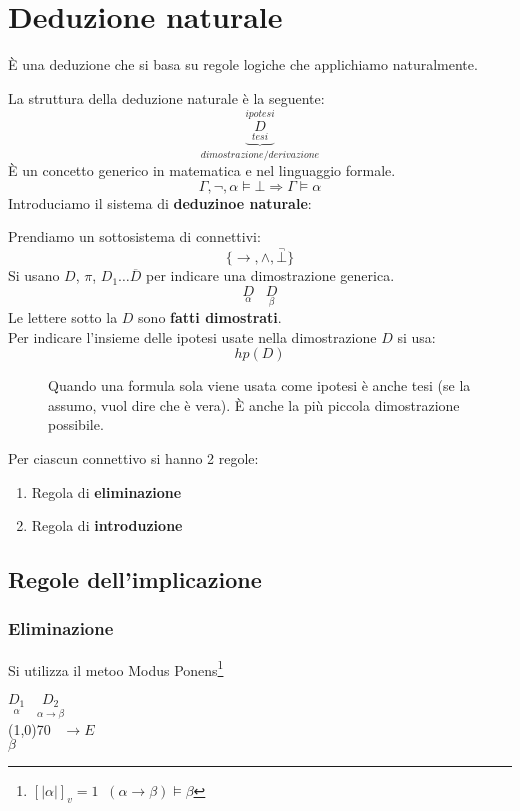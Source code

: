 \documentclass{article}
\theoremstyle{break}
\theoremstyle{break}
\theoremstyle{break}
\theoremstyle{break}
\begin{document}
\section{Deduzione naturale}
È una deduzione che si basa su regole logiche che applichiamo naturalmente.

La struttura della deduzione naturale è la seguente:
\[
    \underbrace{\stackrel{ipotesi}{\underset{tesi}{D}}}_{dimostrazione/derivazione}
\] 
È un concetto generico in matematica e nel linguaggio formale.
\[
\Gamma, \neg, \alpha \models \bot \Rightarrow \Gamma \models \alpha
\] 
Introduciamo il sistema di \textbf{deduzinoe naturale}:

Prendiamo un sottosistema di connettivi:
\[
    \{ \to, \wedge, \stackrel{\neg}{\bot}\} 
\] 
Si usano \( D \), \( \pi \), \( D_1 \ldots \overline{D} \) per indicare una dimostrazione
generica.
\[
    \underset{\alpha}{D}\;\;\; \underset{\beta}{D}
\] 
Le lettere sotto la \( D \) sono \textbf{fatti dimostrati}.\\
Per indicare l'insieme delle ipotesi usate nella dimostrazione \( D \) si usa: 
\[
hp(D)
\] 
\begin{figure}[H]
    \begin{definition}
        Quando una formula sola viene usata come ipotesi è anche tesi (se la assumo, vuol dire che è vera).
        È anche la più piccola dimostrazione possibile.
    \end{definition}
\end{figure}

Per ciascun connettivo si hanno 2 regole:
\begin{enumerate}
    \item Regola di \textbf{eliminazione}
    \item Regola di \textbf{introduzione}
\end{enumerate}

\subsection{Regole dell'implicazione}
\subsubsection{Eliminazione }
Si utilizza il metoo Modus Ponens\footnote{\( [|\alpha|]_v=1\;\; (\alpha \to \beta) \models \beta \) }
\begin{center}
    \(
        \underset{\alpha}{D_1}\;\;\; \underset{\alpha \to \beta}{D_2}
    \)\\ 
    \hspace{1cm}\line(1,0){70}\(\;\;\; \to E \)\\
    \(
        \beta
    \) 
\end{center}
\end{document}
